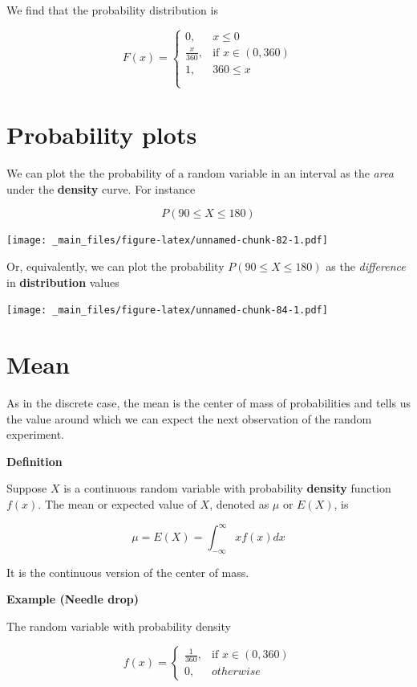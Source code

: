 \documentclass[
]{book}
\begin{document}
We find that the probability distribution is

\[
    F(x)= 
\begin{cases}
    0,& x \leq 0 \\
    \frac{x}{360},& \text{if } x\in (0,360)\\
    1, & 360 \leq x \\
    \\
\end{cases}
\]

\newpage

\hypertarget{probability-plots}{%
\section{Probability plots}\label{probability-plots}}

We can plot the the probability of a random variable in an interval as the \emph{area} under the \textbf{density} curve. For instance

\[P(90\leq X \leq 180)\]

\texttt{[image: \_main\_files/figure-latex/unnamed-chunk-82-1.pdf]}

Or, equivalently, we can plot the probability \(P(90 \leq X \leq 180)\) as the \emph{difference} in \textbf{distribution} values

\texttt{[image: \_main\_files/figure-latex/unnamed-chunk-84-1.pdf]}

\hypertarget{mean}{%
\section{Mean}\label{mean}}

As in the discrete case, the mean is the center of mass of probabilities and tells us the value around which we can expect the next observation of the random experiment.

\textbf{Definition}

Suppose \(X\) is a continuous random variable with probability \textbf{density} function \(f(x)\). The mean or expected value of \(X\), denoted as \(\mu\) or \(E(X)\), is

\[\mu=E(X)=\int_{-\infty}^\infty x f(x) dx\]

It is the continuous version of the center of mass.

\textbf{Example (Needle drop)}

The random variable with probability density

\[
    f(x)= 
\begin{cases}
    \frac{1}{360},& \text{if } x\in (0,360)\\
    0,& otherwise 
\end{cases}
\]
\end{document}
